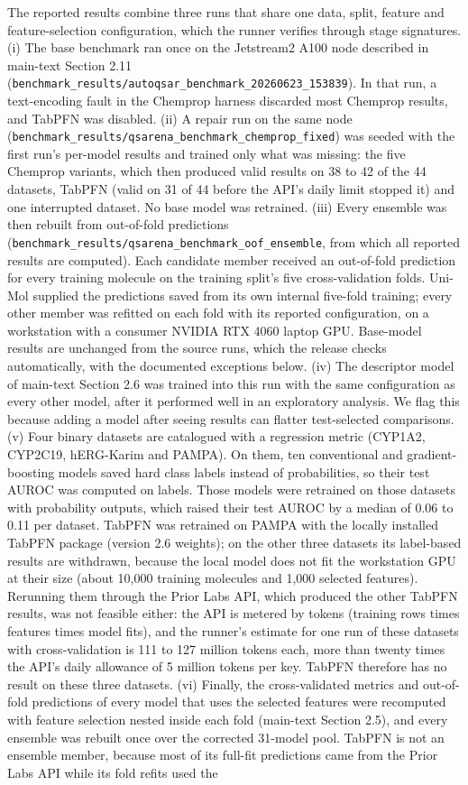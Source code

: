 \documentclass[11pt,a4paper]{article}
\begin{document}
The reported results combine three runs that share one data, split, feature and feature-selection configuration, which the runner verifies through stage signatures. (i) The base benchmark ran once on the Jetstream2 A100 node described in main-text Section 2.11 (\texttt{benchmark\_results/autoqsar\_benchmark\_20260623\_153839}). In that run, a text-encoding fault in the Chemprop harness discarded most Chemprop results, and TabPFN was disabled. (ii) A repair run on the same node (\texttt{benchmark\_results/qsarena\_benchmark\_chemprop\_fixed}) was seeded with the first run's per-model results and trained only what was missing: the five Chemprop variants, which then produced valid results on 38 to 42 of the 44 datasets, TabPFN (valid on 31 of 44 before the API's daily limit stopped it) and one interrupted dataset. No base model was retrained. (iii) Every ensemble was then rebuilt from out-of-fold predictions (\texttt{benchmark\_results/qsarena\_benchmark\_oof\_ensemble}, from which all reported results are computed). Each candidate member received an out-of-fold prediction for every training molecule on the training split's five cross-validation folds. Uni-Mol supplied the predictions saved from its own internal five-fold training; every other member was refitted on each fold with its reported configuration, on a workstation with a consumer NVIDIA RTX 4060 laptop GPU. Base-model results are unchanged from the source runs, which the release checks automatically, with the documented exceptions below. (iv) The descriptor model of main-text Section 2.6 was trained into this run with the same configuration as every other model, after it performed well in an exploratory analysis. We flag this because adding a model after seeing results can flatter test-selected comparisons. (v) Four binary datasets are catalogued with a regression metric (CYP1A2, CYP2C19, hERG-Karim and PAMPA). On them, ten conventional and gradient-boosting models saved hard class labels instead of probabilities, so their test AUROC was computed on labels. Those models were retrained on those datasets with probability outputs, which raised their test AUROC by a median of 0.06 to 0.11 per dataset. TabPFN was retrained on PAMPA with the locally installed TabPFN package (version 2.6 weights); on the other three datasets its label-based results are withdrawn, because the local model does not fit the workstation GPU at their size (about 10,000 training molecules and 1,000 selected features). Rerunning them through the Prior Labs API, which produced the other TabPFN results, was not feasible either: the API is metered by tokens (training rows times features times model fits), and the runner's estimate for one run of these datasets with cross-validation is 111 to 127 million tokens each, more than twenty times the API's daily allowance of 5 million tokens per key. TabPFN therefore has no result on these three datasets. (vi) Finally, the cross-validated metrics and out-of-fold predictions of every model that uses the selected features were recomputed with feature selection nested inside each fold (main-text Section 2.5), and every ensemble was rebuilt once over the corrected 31-model pool. TabPFN is not an ensemble member, because most of its full-fit predictions came from the Prior Labs API while its fold refits used the 
\end{document}
